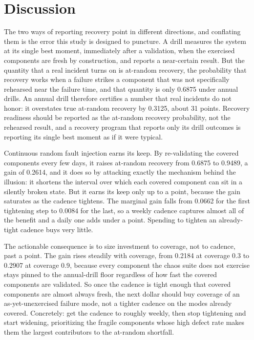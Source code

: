 \documentclass[journal]{IEEEtran}
\begin{document}
\section{Discussion}
The two ways of reporting recovery point in different directions, and conflating them is the error
this study is designed to puncture. A drill measures the system at its single best moment, immediately
after a validation, when the exercised components are fresh by construction, and reports a
near-certain result. But the quantity that a real incident turns on is at-random recovery, the
probability that recovery works when a failure strikes a component that was not specifically
rehearsed near the failure time, and that quantity is only 0.6875 under annual drills. An annual
drill therefore certifies a number that real incidents do not honor: it overstates true at-random
recovery by 0.3125, about 31 points. Recovery readiness should be reported as the at-random recovery
probability, not the rehearsed result, and a recovery program that reports only its drill outcomes is
reporting its single best moment as if it were typical.

Continuous random fault injection earns its keep. By re-validating the covered components every few
days, it raises at-random recovery from 0.6875 to 0.9489, a gain of 0.2614, and it does so by
attacking exactly the mechanism behind the illusion: it shortens the interval over which each covered
component can sit in a silently broken state. But it earns its keep only up to a point, because the
gain saturates as the cadence tightens. The marginal gain falls from 0.0662 for the first tightening
step to 0.0084 for the last, so a weekly cadence captures almost all of the benefit and a daily one
adds under a point. Spending to tighten an already-tight cadence buys very little.

The actionable consequence is to size investment to coverage, not to cadence, past a point. The gain
rises steadily with coverage, from 0.2184 at coverage 0.3 to 0.2907 at coverage 0.9, because every
component the chaos suite does not exercise stays pinned to the annual-drill floor regardless of how
fast the covered components are validated. So once the cadence is tight enough that covered components
are almost always fresh, the next dollar should buy coverage of an as-yet-unexercised failure mode,
not a tighter cadence on the modes already covered. Concretely: get the cadence to roughly weekly,
then stop tightening and start widening, prioritizing the fragile components whose high defect rate
makes them the largest contributors to the at-random shortfall.
\end{document}
